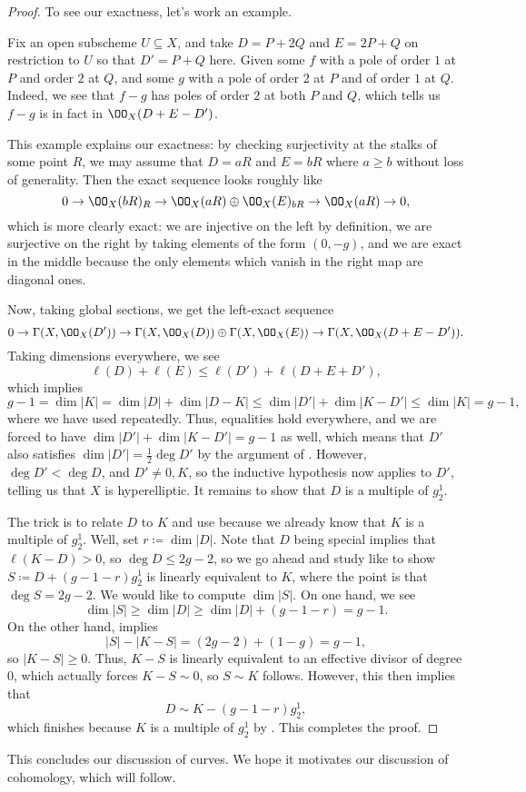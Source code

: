 \documentclass[../notes.tex]{subfiles}
\begin{document}
\begin{proof}
	To see our exactness, let's work an example.
	\begin{example}
		Fix an open subscheme $U\subseteq X$, and take $D=P+2Q$ and $E=2P+Q$ on restriction to $U$ so that $D'=P+Q$ here. Given some $f$ with a pole of order $1$ at $P$ and order $2$ at $Q$, and some $g$ with a pole of order $2$ at $P$ and of order $1$ at $Q$. Indeed, we see that $f-g$ has poles of order $2$ at both $P$ and $Q$, which tells us $f-g$ is in fact in $\OO_X(D+E-D')$.
	\end{example}
	This example explains our exactness: by checking surjectivity at the stalks of some point $R$, we may assume that $D=aR$ and $E=bR$ where $a\ge b$ without loss of generality. Then the exact sequence looks roughly like
	\[0\to\OO_X(bR)_R\to\OO_X(aR)\oplus\OO_X(E)_{bR}\to\OO_X(aR)\to0,\]
	which is more clearly exact: we are injective on the left by definition, we are surjective on the right by taking elements of the form $(0,-g)$, and we are exact in the middle because the only elements which vanish in the right map are diagonal ones.

	Now, taking global sections, we get the left-exact sequence
	\[0\to\Gamma(X,\OO_X(D'))\to\Gamma(X,\OO_X(D))\oplus\Gamma(X,\OO_X(E))\to\Gamma(X,\OO_X(D+E-D')).\]
	Taking dimensions everywhere, we see
	\[\ell(D)+\ell(E)\le\ell(D')+\ell(D+E+D'),\]
	which implies
	\[g-1=\dim|K|=\dim|D|+\dim|D-K|\le\dim|D'|+\dim|K-D'|\le\dim|K|=g-1,\]
	where we have used  repeatedly. Thus, equalities hold everywhere, and we are forced to have $\dim|D'|+\dim|K-D'|=g-1$ as well, which means that $D'$ also satisfies $\dim|D'|=\frac12\deg D'$ by the argument of . However, $\deg D'<\deg D$, and $D'\ne0,K$, so the inductive hypothesis now applies to $D'$, telling us that $X$ is hyperelliptic. It remains to show that $D$ is a multiple of $g^1_2$.

	The trick is to relate $D$ to $K$ and use  because we already know that $K$ is a multiple of $g^1_2$. Well, set $r\coloneqq\dim|D|$. Note that $D$ being special implies that $\ell(K-D)>0$, so $\deg D\le2g-2$, so we go ahead and study like to show $S\coloneqq D+(g-1-r)g^1_2$ is linearly equivalent to $K$, where the point is that $\deg S=2g-2$. We would like to compute $\dim|S|$. On one hand, we see
	\[\dim|S|\ge\dim|D|\ge\dim|D|+(g-1-r)=g-1.\]
	On the other hand,  implies
	\[|S|-|K-S|=(2g-2)+(1-g)=g-1,\]
	so $|K-S|\ge0$. Thus, $K-S$ is linearly equivalent to an effective divisor of degree $0$, which actually forces $K-S\sim0$, so $S\sim K$ follows. However, this then implies that
	\[D\sim K-(g-1-r)g^1_2,\]
	which finishes because $K$ is a multiple of $g^1_2$ by . This completes the proof.
\end{proof}
\begin{remark}
	This concludes our discussion of curves. We hope it motivates our discussion of cohomology, which will follow.
\end{remark}
\end{document}
